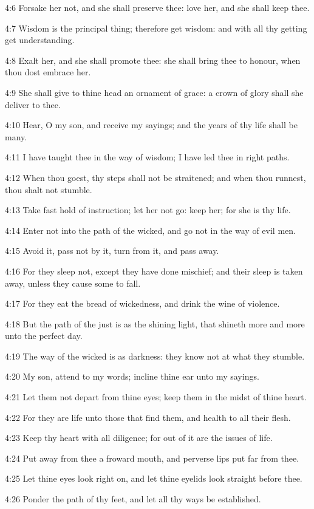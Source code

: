 4:6 Forsake her not, and she shall preserve thee: love her, and she
shall keep thee.

4:7 Wisdom is the principal thing; therefore get wisdom: and with all
thy getting get understanding.

4:8 Exalt her, and she shall promote thee: she shall bring thee to
honour, when thou dost embrace her.

4:9 She shall give to thine head an ornament of grace: a crown of
glory shall she deliver to thee.

4:10 Hear, O my son, and receive my sayings; and the years of thy life
shall be many.

4:11 I have taught thee in the way of wisdom; I have led thee in right
paths.

4:12 When thou goest, thy steps shall not be straitened; and when thou
runnest, thou shalt not stumble.

4:13 Take fast hold of instruction; let her not go: keep her; for she
is thy life.

4:14 Enter not into the path of the wicked, and go not in the way of
evil men.

4:15 Avoid it, pass not by it, turn from it, and pass away.

4:16 For they sleep not, except they have done mischief; and their
sleep is taken away, unless they cause some to fall.

4:17 For they eat the bread of wickedness, and drink the wine of
violence.

4:18 But the path of the just is as the shining light, that shineth
more and more unto the perfect day.

4:19 The way of the wicked is as darkness: they know not at what they
stumble.

4:20 My son, attend to my words; incline thine ear unto my sayings.

4:21 Let them not depart from thine eyes; keep them in the midst of
thine heart.

4:22 For they are life unto those that find them, and health to all
their flesh.

4:23 Keep thy heart with all diligence; for out of it are the issues
of life.

4:24 Put away from thee a froward mouth, and perverse lips put far
from thee.

4:25 Let thine eyes look right on, and let thine eyelids look straight
before thee.

4:26 Ponder the path of thy feet, and let all thy ways be established.

